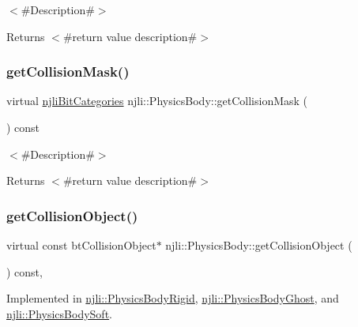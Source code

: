 $<$\#\+Description\#$>$

\begin{DoxyReturn}{Returns}
$<$\#return value description\#$>$ 
\end{DoxyReturn}
\mbox{\label{classnjli_1_1_physics_body_a650d1076cacf8ba50ddbb19691c01324}} 
\subsubsection{\texorpdfstring{get\+Collision\+Mask()}{getCollisionMask()}}
{\footnotesize\ttfamily virtual \mbox{\hyperlink{namespacenjli_af7b302a2b48bb644f85c88080925c974}{njli\+Bit\+Categories}} njli\+::\+Physics\+Body\+::get\+Collision\+Mask (\begin{DoxyParamCaption}{ }\end{DoxyParamCaption}) const\hspace{0.3cm}{\ttfamily [virtual]}}

$<$\#\+Description\#$>$

\begin{DoxyReturn}{Returns}
$<$\#return value description\#$>$ 
\end{DoxyReturn}
\mbox{\label{classnjli_1_1_physics_body_a48031c76bbe2bd9c4540d6d27b8b42bb}} 
\subsubsection{\texorpdfstring{get\+Collision\+Object()}{getCollisionObject()}\hspace{0.1cm}{\footnotesize\ttfamily [1/2]}}
{\footnotesize\ttfamily virtual const bt\+Collision\+Object$\ast$ njli\+::\+Physics\+Body\+::get\+Collision\+Object (\begin{DoxyParamCaption}{ }\end{DoxyParamCaption}) const\hspace{0.3cm}{\ttfamily [protected]}, {}}



Implemented in \mbox{\hyperlink{classnjli_1_1_physics_body_rigid_aa92b1f7c329ae49a2ad80947db1dd7ba}{njli\+::\+Physics\+Body\+Rigid}}, \mbox{\hyperlink{classnjli_1_1_physics_body_ghost_a79b35eaf9c790ef43ad3e0f4a8a4c518}{njli\+::\+Physics\+Body\+Ghost}}, and \mbox{\hyperlink{classnjli_1_1_physics_body_soft_a41f7c080d5c79ed719cfcfb0de35a449}{njli\+::\+Physics\+Body\+Soft}}.

